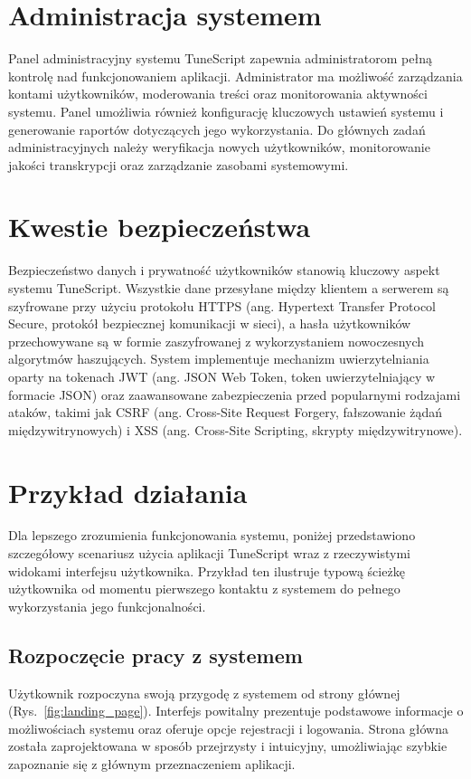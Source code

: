 \documentclass[a4paper,twoside,12pt]{book}
\begin{document}
\section{Administracja systemem}

Panel administracyjny systemu TuneScript zapewnia administratorom pełną kontrolę nad funkcjonowaniem aplikacji. Administrator ma możliwość zarządzania kontami użytkowników, moderowania treści oraz monitorowania aktywności systemu. Panel umożliwia również konfigurację kluczowych ustawień systemu i generowanie raportów dotyczących jego wykorzystania. Do głównych zadań administracyjnych należy weryfikacja nowych użytkowników, monitorowanie jakości transkrypcji oraz zarządzanie zasobami systemowymi.

\section{Kwestie bezpieczeństwa}

Bezpieczeństwo danych i prywatność użytkowników stanowią kluczowy aspekt systemu TuneScript. Wszystkie dane przesyłane między klientem a serwerem są szyfrowane przy użyciu protokołu HTTPS (ang. Hypertext Transfer Protocol Secure, protokół bezpiecznej komunikacji w sieci), a hasła użytkowników przechowywane są w formie zaszyfrowanej z wykorzystaniem nowoczesnych algorytmów haszujących. System implementuje mechanizm uwierzytelniania oparty na tokenach JWT (ang. JSON Web Token, token uwierzytelniający w formacie JSON) oraz zaawansowane zabezpieczenia przed popularnymi rodzajami ataków, takimi jak CSRF (ang. Cross-Site Request Forgery, fałszowanie żądań międzywitrynowych) i XSS (ang. Cross-Site Scripting, skrypty międzywitrynowe). 

\section{Przykład działania}
Dla lepszego zrozumienia funkcjonowania systemu, poniżej przedstawiono szczegółowy scenariusz użycia aplikacji TuneScript wraz z rzeczywistymi widokami interfejsu użytkownika. Przykład ten ilustruje typową ścieżkę użytkownika od momentu pierwszego kontaktu z systemem do pełnego wykorzystania jego funkcjonalności.

\subsection{Rozpoczęcie pracy z systemem}
Użytkownik rozpoczyna swoją przygodę z systemem od strony głównej (Rys.~\ref{fig:landing_page}). 
Interfejs powitalny prezentuje podstawowe informacje o możliwościach systemu oraz oferuje opcje rejestracji i logowania. 
Strona główna została zaprojektowana w sposób przejrzysty i intuicyjny, umożliwiając szybkie zapoznanie się 
z głównym przeznaczeniem aplikacji.
\end{document}
